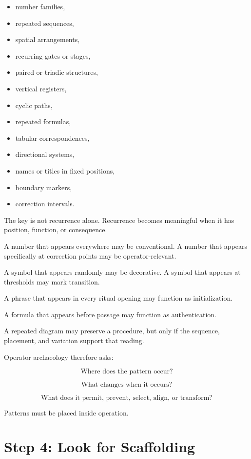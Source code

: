 \documentclass[11pt]{book}
\begin{document}
\begin{itemize}
    \item number families,
    \item repeated sequences,
    \item spatial arrangements,
    \item recurring gates or stages,
    \item paired or triadic structures,
    \item vertical registers,
    \item cyclic paths,
    \item repeated formulas,
    \item tabular correspondences,
    \item directional systems,
    \item names or titles in fixed positions,
    \item boundary markers,
    \item correction intervals.
\end{itemize}

The key is not recurrence alone. Recurrence becomes meaningful when it has position, function, or consequence.

A number that appears everywhere may be conventional. A number that appears specifically at correction points may be operator-relevant.

A symbol that appears randomly may be decorative. A symbol that appears at thresholds may mark transition.

A phrase that appears in every ritual opening may function as initialization.

A formula that appears before passage may function as authentication.

A repeated diagram may preserve a procedure, but only if the sequence, placement, and variation support that reading.

Operator archaeology therefore asks:

\[
\text{Where does the pattern occur?}
\]

\[
\text{What changes when it occurs?}
\]

\[
\text{What does it permit, prevent, select, align, or transform?}
\]

Patterns must be placed inside operation.

\section{Step 4: Look for Scaffolding}
\end{document}
